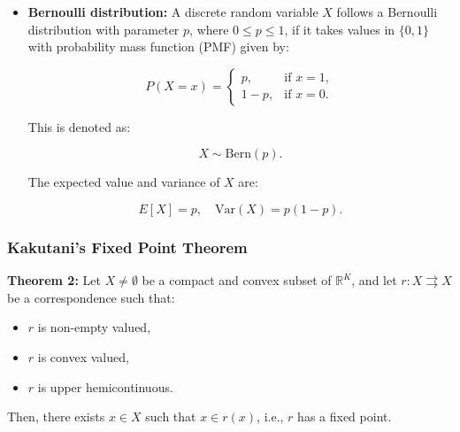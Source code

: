 \documentclass{article}
\begin{document}
\begin{itemize}
    \item \textbf{Bernoulli distribution:}\label{berno}
        A discrete random variable \( X \) follows a Bernoulli distribution with parameter \( p \), where \( 0 \leq p \leq 1 \), if it takes values in \( \{0,1\} \) with probability mass function (PMF) given by:
        
        \[
        P(X = x) =
        \begin{cases}
            p, & \text{if } x = 1, \\
            1 - p, & \text{if } x = 0.
        \end{cases}
        \]
        
        This is denoted as:
        
        \[
        X \sim \text{Bern}(p).
        \]
        
        The expected value and variance of \( X \) are:
        
        \[
        E[X] = p, \quad \text{Var}(X) = p(1 - p).
        \]
\end{itemize}

\subsubsection{Kakutani's Fixed Point Theorem}\label{kak}

\textbf{Theorem 2:} Let \( X \neq \emptyset \) be a compact and convex subset of \( \mathbb{R}^K \), and let \( r : X \rightrightarrows X \) be a correspondence such that:
\begin{itemize}
    \item \( r \) is non-empty valued,
    \item \( r \) is convex valued,
    \item \( r \) is upper hemicontinuous.
\end{itemize}
Then, there exists \( x \in X \) such that \( x \in r(x) \), i.e., \( r \) has a fixed point.
\end{document}
